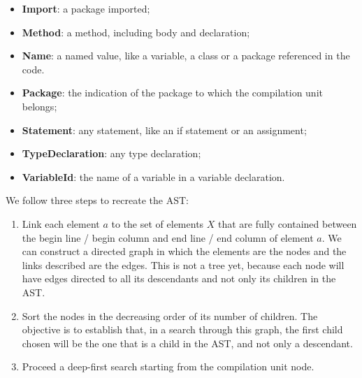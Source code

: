 \documentclass[
]{article}
\begin{document}
\begin{itemize}
\item \textbf{Import}: a package imported;

\item \textbf{Method}: a method, including body and declaration;

\item \textbf{Name}: a named value, like a variable, a class or a package referenced in the code.

\item \textbf{Package}: the indication of the package to which the compilation unit belongs;

\item \textbf{Statement}: any statement, like an if statement or an assignment;

\item \textbf{TypeDeclaration}: any type declaration;

\item \textbf{VariableId}: the name of a variable in a variable declaration.
\end{itemize}

We follow three steps to recreate the AST:

\begin{enumerate}
\def\labelenumi{\arabic{enumi}.}
\item
  Link each element \(a\) to the set of elements \(X\) that are fully
  contained between the begin line / begin column and end line / end
  column of element \(a\). We can construct a directed graph in which
  the elements are the nodes and the links described are the edges. This
  is not a tree yet, because each node will have edges directed to all
  its descendants and not only its children in the AST.
  
\item
  Sort the nodes in the decreasing order of its number of children. The
  objective is to establish that, in a search through this graph, the
  first child chosen will be the one that is a child in the AST, and not
  only a descendant.
  
\item
  Proceed a deep-first search starting from the compilation unit node.
\end{enumerate}

%
%
\end{document}
